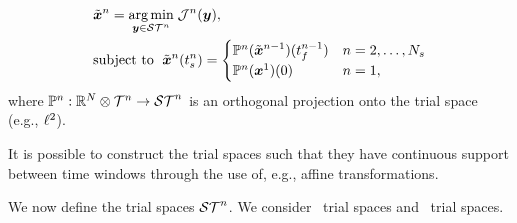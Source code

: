 \begin{equation}\label{eq:tclsrm}
\begin{split}
       &\tilde{\boldsymbol x}^{n} =  \underset{\boldsymbol y \in \mathcal{ ST }^n}{\text{arg\,min}} \; \mathcal{J}^n(\boldsymbol y), \\ 
      &\text{subject to }\;  \tilde{\boldsymbol x}^{n}(t_s^{n}) =
\begin{cases}\mathbb{P}^n (\tilde{\boldsymbol x}^{n-1})(t_f^{n-1}) & n = 2,\ldots,N_s \\
\mathbb{P}^n( {\boldsymbol x}^{1})(0)& n=1, \end{cases} 
\end{split}
\end{equation}
where $\mathbb{P}^n: \mathbb{R}^{N} \otimes \mathcal{T}^{n} \rightarrow \mathcal{ ST }^{n}$ is an orthogonal projection onto the 
trial space (e.g., $\ell^2$).
\begin{remark}
It is possible to construct the trial spaces such that they have continuous support between time windows through the 
use of, e.g., affine transformations.
\end{remark}
We now define the trial spaces $\mathcal{ ST }^{n}$. We consider \spatialAcronym\ trial spaces and \spaceTimeAcronym\ trial spaces. 
